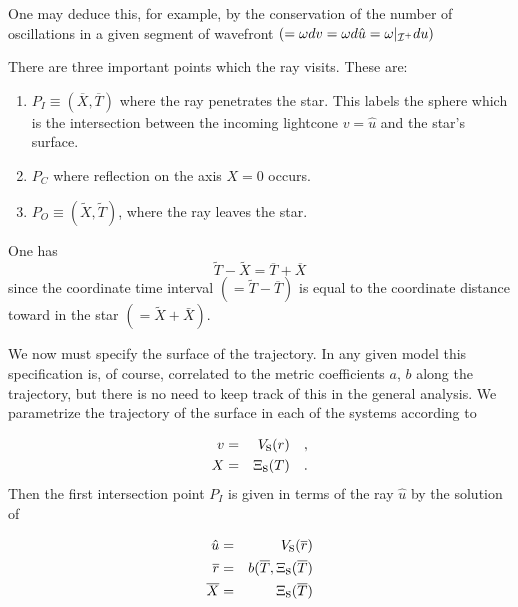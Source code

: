 \documentclass[12pt,oneside]{report}
\def\beq {\begin{equation}}
\def\feq {\end{equation}}
\begin{document}
{\noindent  One may deduce this, for example, by the
conservation of the number of oscillations in a given segment
of wavefront $( =  \omega d v = \omega d {\hat u} =
\omega \vert_{{\cal I}^+} d u)$


There are three important points which the ray visits. These
are:

\begin{enumerate}
\item $P_I\equiv ({\overline X},{\overline T})$ where the ray penetrates the
star. This labels the sphere which is the intersection between
the incoming lightcone $ v = \hat u$ and the star's surface.
\item $P_C$ where reflection on the axis $X = 0$ occurs.
\item $P_O\equiv ({\tilde X}, {\tilde T})$, where the ray leaves the
star.
\end{enumerate}

\noindent One has
\beq {\tilde T} - {\tilde X} = {\overline T} + {\overline X} \label{AHwrad4} \feq
\noindent since the coordinate time interval $ (= {\tilde T}
- {\overline T}) $ is equal to the coordinate distance toward
in the star $ (= {\tilde X} + {\bar X}) $.


We now must specify the surface of the trajectory. In any
given model this specification is, of course, correlated to
the metric coefficients $a$, $b$ along the trajectory, but there
is no need to keep track of this in the general analysis. We
parametrize the trajectory of the surface in each of the
systems according to

\begin{eqnarray}
v &=& V_{\mbox{\rm s}} (r)\quad ,  \nonumber \\
X &=& \Xi_{\mbox{\rm s}} (T)\quad .  \label{AHwrad5}
\end{eqnarray}
\noindent Then the first intersection point $P_I$ is given in terms
of the ray $ {\hat u}$ by the solution of

\begin{eqnarray}
{\hat u} &=& V_{\mbox{\rm s}} ({\overline r})\nonumber \\
{\overline r} &=& b ( {\overline T}, \Xi_{\mbox{\rm s}} ({\overline
T}) \nonumber \\
{\overline X} &=& \Xi_{\mbox{\rm s}} ({\overline T}) \label{AHwrad6}
\end{eqnarray}

}
\end{document}
